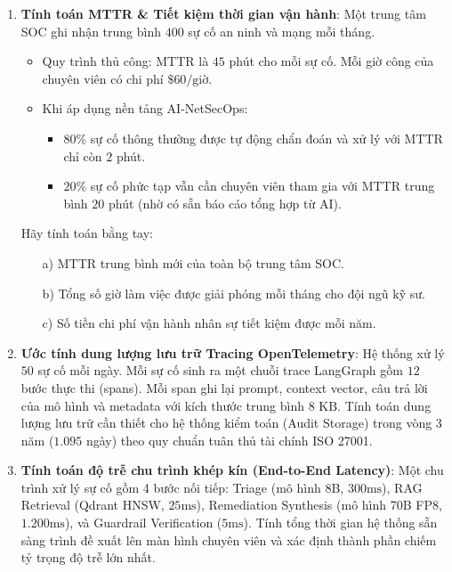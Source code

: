 \begin{enumerate}[label=\textbf{B\arabic*.}]
  \item \textbf{Tính toán MTTR \& Tiết kiệm thời gian vận hành}:
  Một trung tâm SOC ghi nhận trung bình $400$ sự cố an ninh và mạng mỗi tháng.
  \begin{itemize}
    \item Quy trình thủ công: MTTR là $45$ phút cho mỗi sự cố. Mỗi giờ công của chuyên viên có chi phí $\$60\text{/giờ}$.
    \item Khi áp dụng nền tảng AI-NetSecOps:
      \begin{itemize}
        \item $80\%$ sự cố thông thường được tự động chẩn đoán và xử lý với MTTR chỉ còn $2$ phút.
        \item $20\%$ sự cố phức tạp vẫn cần chuyên viên tham gia với MTTR trung bình $20$ phút (nhờ có sẵn báo cáo tổng hợp từ AI).
      \end{itemize}
  \end{itemize}
  Hãy tính toán bằng tay:
  \begin{itemize}
    \item[a)] MTTR trung bình mới của toàn bộ trung tâm SOC.
    \item[b)] Tổng số giờ làm việc được giải phóng mỗi tháng cho đội ngũ kỹ sư.
    \item[c)] Số tiền chi phí vận hành nhân sự tiết kiệm được mỗi năm.
  \end{itemize}

  \item \textbf{Ước tính dung lượng lưu trữ Tracing OpenTelemetry}:
  Hệ thống xử lý $50$ sự cố mỗi ngày. Mỗi sự cố sinh ra một chuỗi trace LangGraph gồm $12$ bước thực thi (spans). Mỗi span ghi lại prompt, context vector, câu trả lời của mô hình và metadata với kích thước trung bình $8\text{ KB}$.
  Tính toán dung lượng lưu trữ cần thiết cho hệ thống kiểm toán (Audit Storage) trong vòng 3 năm ($1.095$ ngày) theo quy chuẩn tuân thủ tài chính ISO 27001.

  \item \textbf{Tính toán độ trễ chu trình khép kín (End-to-End Latency)}:
  Một chu trình xử lý sự cố gồm 4 bước nối tiếp: Triage (mô hình 8B, $300\text{ms}$), RAG Retrieval (Qdrant HNSW, $25\text{ms}$), Remediation Synthesis (mô hình 70B FP8, $1.200\text{ms}$), và Guardrail Verification ($5\text{ms}$). Tính tổng thời gian hệ thống sẵn sàng trình đề xuất lên màn hình chuyên viên và xác định thành phần chiếm tỷ trọng độ trễ lớn nhất.


\end{enumerate}
